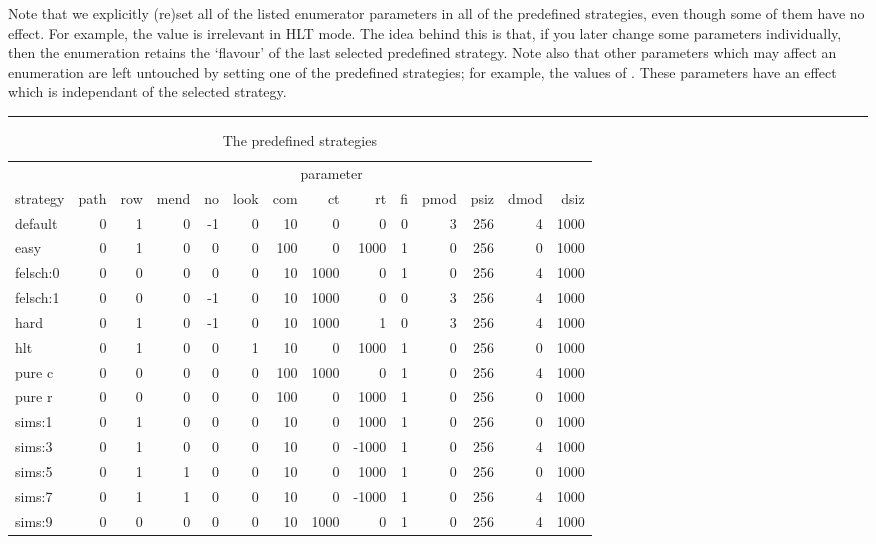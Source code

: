 Note that we explicitly (re)set all of the listed enumerator parameters in
  all of the predefined strategies, even though some of them have no
  effect.
For example, the  value is irrelevant in HLT mode.
The idea behind this is that, if you later change some parameters
  individually, then the enumeration retains the `flavour' of the last
  selected predefined strategy.
Note also that other parameters which may affect an enumeration are left
  untouched by setting one of the predefined strategies; for example, the
  values of  \amp {}.
These parameters have an effect which is independant of the selected 
  strategy.

\begin{table}
\hrule
\caption{The predefined strategies}
\label{tab:pred}
\smallskip
\renewcommand{\arraystretch}{0.875}
\begin{tabular*}{\textwidth}{@{\extracolsep{\fill}}lrrrrrrrrrrrrr} 
\hline\hline
          & \multicolumn{13}{c}{parameter} \\ 
\cline{2-14}
strategy & path & row & mend & no & look & com & ct   & rt    & fi & pmod & psiz & dmod & dsiz \\ 
\hline
default& 0   & 1   & 0    & -1 & 0    & 10  & 0    & 0     & 0  & 3    & 256  & 4    & 1000 \\
easy   & 0   & 1   & 0    & 0  & 0    & 100 & 0    & 1000  & 1  & 0    & 256  & 0    & 1000 \\
felsch:0& 0   & 0   & 0    & 0  & 0    & 10  & 1000 & 0     & 1  & 0    & 256  & 4    & 1000 \\
felsch:1& 0   & 0   & 0    & -1 & 0    & 10  & 1000 & 0     & 0  & 3    & 256  & 4    & 1000 \\
hard   & 0   & 1   & 0    & -1 & 0    & 10  & 1000 & 1     & 0  & 3    & 256  & 4    & 1000 \\
hlt    & 0   & 1   & 0    & 0  & 1    & 10  & 0    & 1000  & 1  & 0    & 256  & 0    & 1000 \\
pure c & 0   & 0   & 0    & 0  & 0    & 100 & 1000 & 0     & 1  & 0    & 256  & 4    & 1000 \\
pure r & 0   & 0   & 0    & 0  & 0    & 100 & 0    & 1000  & 1  & 0    & 256  & 0    & 1000 \\
sims:1 & 0   & 1   & 0    & 0  & 0    & 10  & 0    & 1000  & 1  & 0    & 256  & 0    & 1000 \\
sims:3 & 0   & 1   & 0    & 0  & 0    & 10  & 0    & -1000 & 1  & 0    & 256  & 4    & 1000 \\
sims:5 & 0   & 1   & 1    & 0  & 0    & 10  & 0    & 1000  & 1  & 0    & 256  & 0    & 1000 \\
sims:7 & 0   & 1   & 1    & 0  & 0    & 10  & 0    & -1000 & 1  & 0    & 256  & 4    & 1000 \\
sims:9 & 0   & 0   & 0    & 0  & 0    & 10  & 1000 & 0     & 1  & 0    & 256  & 4    & 1000 \\
\hline\hline
\end{tabular*}
\end{table}

